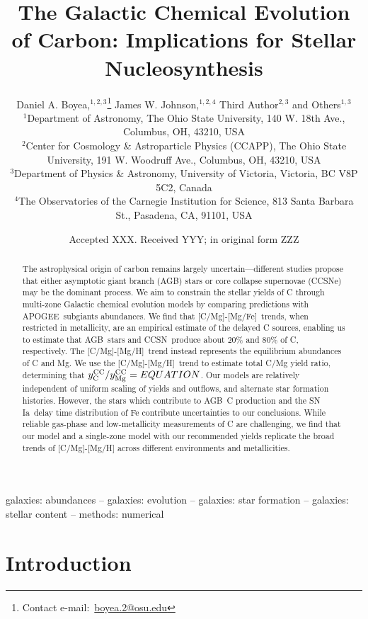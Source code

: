 \documentclass[fleqn,
usenatbib]{mnras}
\title[The Origin and Galactic Evolution of Carbon]{The Galactic Chemical Evolution of Carbon: Implications for Stellar Nucleosynthesis }
\author[D. A. Boyea et. al.]{%
Daniel A. Boyea,$^{1, 2, 3}$\thanks{%
Contact e-mail:~\href{mailto:boyea.2@osu.edu}{boyea.2@osu.edu}}
James W. Johnson,$^{1, 2, 4}$
Third Author$^{2,3}$
and Others$^{1,3}$
\\
$^{1}$Department of Astronomy, The Ohio State University, 140 W. 18th Ave., Columbus, OH, 43210, USA
\\
$^{2}$Center for Cosmology \& Astroparticle Physics (CCAPP), The Ohio State University, 191 W. Woodruff Ave., Columbus, OH, 43210, USA
\\
$^{3}$Department of Physics \& Astronomy, University of Victoria, Victoria, BC V8P 5C2, Canada
\\
$^{4}$The Observatories of the Carnegie Institution for Science, 813 Santa Barbara St., Pasadena, CA, 91101, USA
}
\date{Accepted XXX. Received YYY; in original form ZZZ}
\newcommand{\agb}{AGB}
\newcommand{\apogee}{APOGEE}
\newcommand{\cc}{CCSN}
\newcommand{\ia}{SN Ia}
\newcommand{\caah}{[C/Mg]-[Mg/H]}
\newcommand{\caafe}{[C/Mg]-[Mg/Fe]}
\newcommand{\Ycc}{{y_{\rm C}^{\rm CC}}}
\newcommand{\Yoc}{{y_{\rm Mg}^{\rm CC}}}
\begin{document}
\label{firstpage}
\pagerange{\pageref{firstpage}--\pageref{lastpage}}
\maketitle



\begin{abstract}
The astrophysical origin of carbon remains largely uncertain---different studies propose that either asymptotic giant branch (AGB) stars or core collapse supernovae (CCSNe) may be the dominant process.
% 
We aim to constrain the stellar yields of C through multi-zone Galactic chemical evolution models by comparing predictions with \apogee\ subgiants abundances.
% 
We find that \caafe\ trends, when restricted in metallicity, are an empirical estimate of the delayed C sources, enabling us to estimate that \agb\ stars and \cc\ produce about 20\% and 80\% of C, respectively.  
The \caah\ trend instead represents the equilibrium abundances of C and Mg. 
We use the \caah\ trend to estimate total C/Mg yield ratio, determining that  $\Ycc/\Yoc = EQUATION$.
Our models are relatively independent of uniform scaling of yields and outflows, and alternate star formation histories. 
However, the stars which contribute to \agb\ C production and the \ia\ delay time distribution of Fe contribute uncertainties to our conclusions. 
While reliable gas-phase and low-metallicity measurements of C are challenging, we find that our model and a single-zone model with our recommended yields replicate the broad trends of \caah{} across different environments and metallicities. 

\end{abstract}

\begin{keywords}
galaxies: abundances -- galaxies: evolution -- galaxies: star formation -- galaxies: stellar content -- methods: numerical
\end{keywords}





\section{Introduction}
\end{document}
